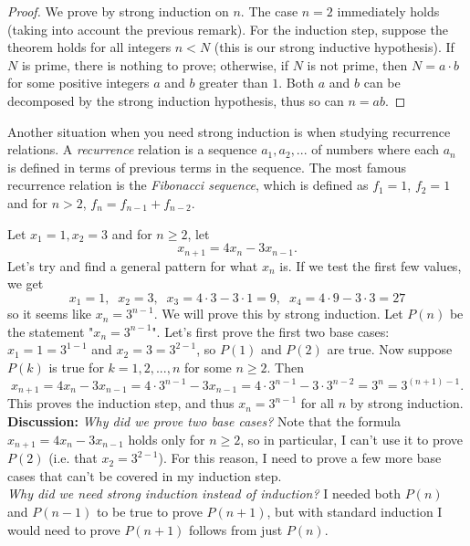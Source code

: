 \documentclass[11pt,dvipsnames]{book}
\numberwithin{equation}{section} %
\numberwithin{figure}{section} %
\numberwithin{table}{section} %
\begin{document}
\begin{proof}
We prove by strong induction on $n$. The case $n=2$ immediately holds (taking into account the previous remark). For the induction step, suppose the theorem holds for all integers $n<N$ (this is our strong inductive hypothesis).  If $N$ is prime, there is nothing to prove; otherwise, if $N$ is not prime, then $N=a\cdot b$ for some positive integers $a$ and $b$ greater than $1$. Both $a$ and $b$ can be  decomposed by the strong induction hypothesis, thus so can $n=ab$.
\end{proof}

Another situation when you need strong induction is when studying recurrence relations. A {\it recurrence} relation is a sequence $a_{1},a_{2},...$ of numbers  where each $a_{n}$ is defined in terms of previous terms in the sequence. The most famous recurrence relation is the {\it Fibonacci sequence}, which is defined  as $f_{1}=1$, $f_{2}=1$ and for $n>2$, $f_{n}=f_{n-1}+f_{n-2}$. 

\begin{example}
Let $x_{1}=1, x_{2} =3$ and for $n\geq 2$, let
\[
x_{n+1} = 4x_{n}-3x_{n-1}.
\]
Let's try and find a general pattern for what $x_{n}$ is. If we test the first few values, we get 
\[
x_{1} = 1, \;\; x_{2} = 3 , \;\; x_{3} = 4\cdot 3-3\cdot 1 = 9, \;\; x_{4} = 4\cdot 9 - 3\cdot 3 = 27
\]
so it seems like $x_{n} = 3^{n-1}$. We will prove this by strong induction. Let $P(n)$ be the statement "$x_{n} = 3^{n-1}$". Let's first prove the first two base cases: $x_{1}=1=3^{1-1}$ and $x_{2}=3=3^{2-1}$, so $P(1)$ and $P(2)$ are true. Now  suppose $P(k)$ is true for $k=1,2,...,n$ for some $n\geq 2$. Then
\[
x_{n+1} =4x_{n}-3x_{n-1} = 4\cdot 3^{n-1} -3x_{n-1} = 4\cdot 3^{n-1} - 3\cdot 3^{n-2} = 3^{n} = 3^{(n+1)-1}.
\]
This proves the induction step, and thus $x_n=3^{n-1}$ for all $n$ by strong induction.\\

{\bf Discussion:} {\it Why did we prove two base cases?} Note that the formula $x_{n+1} =4x_{n}-3x_{n-1} $ holds only for $n\geq 2$, so in particular, I can't use it to prove $P(2)$ (i.e. that $x_{2}=3^{2-1}$). For this reason, I need to prove a few more base cases that can't be covered in my induction step. \\

{\it Why did we need strong induction instead of induction?}  I needed both $P(n)$ and $P(n-1)$ to be true to prove $P(n+1)$, but with standard induction I would need to prove $P(n+1)$ follows from just $P(n)$.\\
\end{example}
\end{document}
